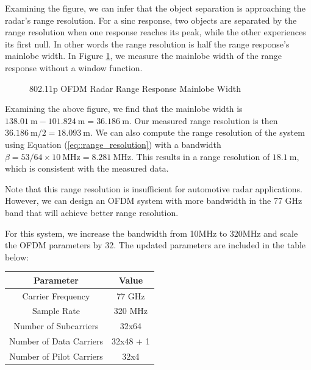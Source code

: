 \documentclass[conference]{IEEEtran}
\begin{document}
Examining the figure, we can infer that the object separation is approaching the radar's range resolution. For a sinc response, two objects are separated by the range resolution when one response reaches its peak, while the other experiences its first null. In other words the range resolution is half the range response's mainlobe width. In Figure \ref{fig::ofdm_radar_mainlobe_width}, we measure the mainlobe width of the range response without a window function.

\begin{figure}[H]
\centering
{}
\caption{802.11p OFDM Radar Range Response Mainlobe Width}
\label{fig::ofdm_radar_mainlobe_width}
\end{figure}

Examining the above figure, we find that the mainlobe width is $138.01\ \text{m} - 101.824\ \text{m} = 36.186\ \text{m}$. Our measured range resolution is then $36.186\ \text{m} /2 = 18.093 \ \text{m}$. We can also compute the range resolution of the system using Equation (\ref{eq::range_resolution}) with a bandwidth $\beta = 53/64 \times 10\ \text{MHz} = 8.281\ \text{MHz}$. This results in a range resolution of $18.1\ \text{m}$, which is consistent with the measured data.

Note that this range resolution is insufficient for automotive radar applications. However, we can design an OFDM system with more bandwidth in the 77 GHz band that will achieve better range resolution. 

For this system, we increase the bandwidth from 10MHz to 320MHz and scale the OFDM parameters by 32. The updated parameters are included in the table below:

\begin{center}
\begin{tabular}{|c|c|}
\hline
\textbf {Parameter} & \textbf {Value }\\
\hline
Carrier Frequency & 77 GHz \\
\hline
Sample Rate & 320 MHz \\
\hline
Number of Subcarriers & 32x64\\
\hline
Number of Data Carriers & 32x48 + 1 \\
\hline 
Number of Pilot Carriers & 32x4 \\
\hline 
\end{tabular}
\end{center}
\end{document}
